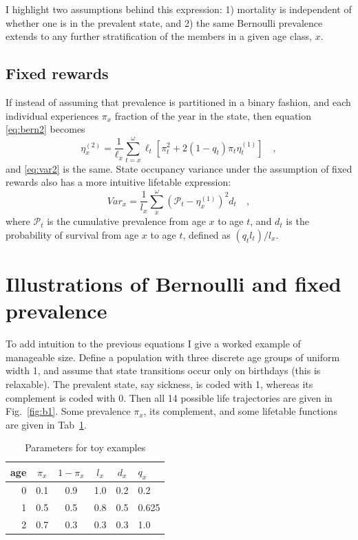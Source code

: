\documentclass[a4paper]{article}
\begin{document}
I highlight two assumptions behind this expression: 1) mortality is independent of whether one is in the prevalent state, and 2) the same Bernoulli prevalence extends to any further stratification of the members in a given age class, $x$.

\subsection*{Fixed rewards}
If instead of assuming that prevalence is partitioned in a binary fashion, and each individual experiences $\pi_x$ fraction of the year in the state, then equation \eqref{eq:bern2} becomes
\begin{equation}
\eta^{(2)}_x = \frac{1}{\ell_x} \sum_{t=x}^\omega \ell_t\left[\pi_t^2 + 2(1-q_t)\pi_t\eta^{(1)}_t\right] \quad \mathrm{,}
\end{equation}
and \eqref{eq:var2} is the same. State occupancy variance under the assumption of fixed rewards also has a more intuitive lifetable expression:
\begin{equation}
\label{eq:varfixed2}
Var_x = \frac{1}{l_x}\sum_x^\omega (\mathcal{P}_t - \eta^{(1)}_x)^2 d_t \quad\mathrm{,}
\end{equation}
where $\mathcal{P}_t$ is the cumulative prevalence from age $x$ to age $t$, and $d_t$ is the probability of survival from age $x$ to age $t$, defined as $(q_t l_t)/l_x$. 
\section{Illustrations of Bernoulli and fixed prevalence}
To add intuition to the previous equations I give a worked example of manageable size. Define a population with three discrete age groups of uniform width 1, and assume that state transitions occur only on birthdays (this is relaxable). The prevalent state, say sickness, is coded with 1, whereas its complement is coded with 0. Then all 14 possible life trajectories are given in Fig.~\ref{fig:b1}. Some prevalence $\pi_x$, its complement, and some lifetable functions are given in Tab~\ref{tab:toy}.

\begin{table}[ht!]
\begin{tabular}{r|ccccl}
age & $\pi_x$ & $1-\pi_x$ & $l_x$ & $d_x$ & $q_x$\\
\hline
0 & 0.1 & 0.9 & 1.0 & 0.2 & 0.2   \\
1 & 0.5 & 0.5 & 0.8 & 0.5 & 0.625 \\
2 & 0.7 & 0.3 & 0.3 & 0.3 & 1.0  
\end{tabular}
\caption{Parameters for toy examples}
\label{tab:toy}
\end{table}
\end{document}
